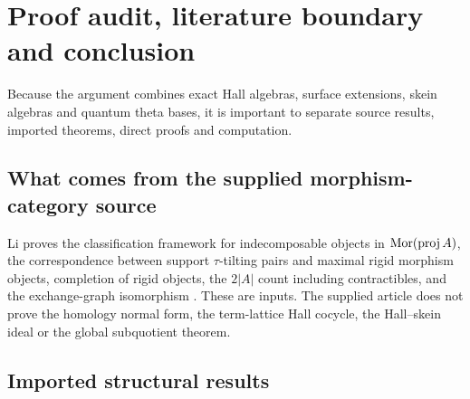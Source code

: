 \section{Proof audit, literature boundary and conclusion}
\label{sec:audit}

Because the argument combines exact Hall algebras, surface extensions, skein
algebras and quantum theta bases, it is important to separate source results,
imported theorems, direct proofs and computation.

\subsection{What comes from the supplied morphism-category source}

Li proves the classification framework for indecomposable objects in
$\operatorname{Mor}(\operatorname{proj} A)$, the correspondence between support $\tau$-tilting pairs and
maximal rigid morphism objects, completion of rigid objects, the $2|A|$ count
including contractibles, and the exchange-graph isomorphism \cite{Li}.  These
are inputs.  The supplied article does not prove the homology normal form, the
term-lattice Hall cocycle, the Hall--skein ideal or the global subquotient
theorem.

\subsection{Imported structural results}

